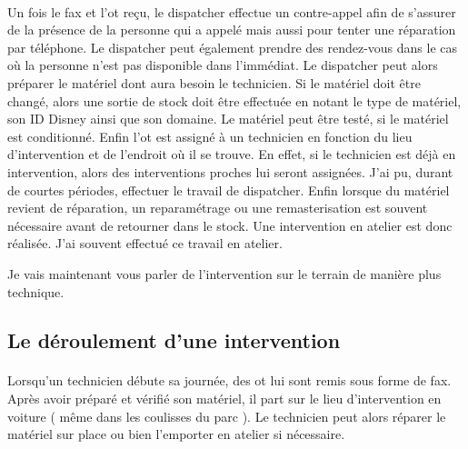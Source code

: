 \paragraph{}
Un fois le fax et l'\gls{ot} reçu, le \gls{dispatcher} effectue un contre-appel afin de s'assurer de la présence de la personne qui a appelé mais aussi pour tenter une réparation par téléphone. Le \gls{dispatcher} peut également prendre des rendez-vous dans le cas où la personne n'est pas disponible dans l’immédiat.
Le \gls{dispatcher} peut alors préparer le matériel dont aura besoin le technicien. Si le matériel doit être changé, alors une sortie de stock doit être effectuée en notant le type de matériel, son ID Disney ainsi que son domaine. Le matériel peut être testé, si le matériel est conditionné. Enfin l'\gls{ot} est assigné à un technicien en fonction du lieu d'intervention et de l'endroit où il se trouve. En effet, si le technicien est déjà en intervention, alors des interventions proches lui seront assignées. 
J'ai pu, durant de courtes périodes, effectuer le travail de \gls{dispatcher}.
Enfin lorsque du matériel revient de réparation, un reparamétrage ou une remasterisation est souvent nécessaire avant de retourner dans le stock. Une intervention en atelier est donc réalisée.
J'ai souvent effectué ce travail en atelier.

Je vais maintenant vous parler de l'intervention sur le terrain de manière plus technique.


\subsection{Le déroulement d'une intervention}%
\paragraph{}
Lorsqu'un technicien débute sa journée, des \gls{ot} lui sont remis sous forme de fax. Après avoir préparé et vérifié son matériel, il part sur le lieu d'intervention en voiture ( même dans les coulisses du parc ). 
Le technicien peut alors réparer le matériel sur place ou bien l'emporter en atelier si nécessaire.

